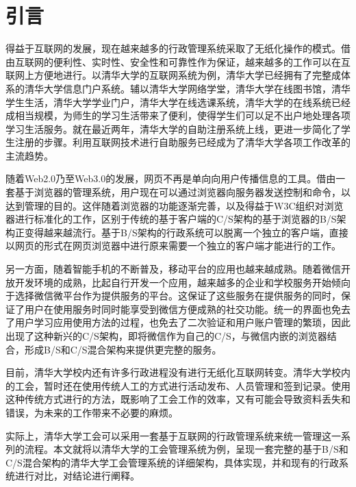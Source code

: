 \chapter{引言}

得益于互联网的发展，现在越来越多的行政管理系统采取了无纸化操作的模式。借由互联网的便利性、实时性、安全性和可靠性作为保证，越来越多的工作可以在互联网上方便地进行。以清华大学的互联网系统为例，清华大学已经拥有了完整成体系的清华大学信息门户系统。辅以清华大学网络学堂，清华大学在线图书馆，清华学生生活，清华大学学业门户，清华大学在线选课系统，清华大学的在线系统已经成相当规模，为师生的学习生活带来了便利，使得学生们可以足不出户地处理各项学习生活服务。就在最近两年，清华大学的自助注册系统上线，更进一步简化了学生注册的步骤。利用互联网技术进行自助服务已经成为了清华大学各项工作改革的主流趋势。

随着Web2.0乃至Web3.0的发展，网页不再是单向向用户传播信息的工具。借由一套基于浏览器的管理系统，用户现在可以通过浏览器向服务器发送控制和命令，以达到管理的目的。这伴随着浏览器的功能逐渐完善，以及得益于W3C组织对浏览器进行标准化的工作，区别于传统的基于客户端的C/S架构的基于浏览器的B/S架构正变得越来越流行。基于B/S架构的行政系统可以脱离一个独立的客户端，直接以网页的形式在网页浏览器中进行原来需要一个独立的客户端才能进行的工作。

另一方面，随着智能手机的不断普及，移动平台的应用也越来越成熟。随着微信开放开发环境的成熟，比起自行开发一个应用，越来越多的企业和学校服务开始倾向于选择微信微平台作为提供服务的平台。这保证了这些服务在提供服务的同时，保证了用户在使用服务时同时能享受到微信方便成熟的社交功能。统一的界面也免去了用户学习应用使用方法的过程，也免去了二次验证和用户账户管理的繁琐，因此出现了这种新兴的C/S架构，即将微信作为自己的C/S，与微信内嵌的浏览器结合，形成B/S和C/S混合架构来提供更完整的服务。

目前，清华大学校内还有许多行政进程没有进行无纸化互联网转变。清华大学校内的工会，暂时还在使用传统人工的方式进行活动发布、人员管理和签到记录。使用这种传统方式进行的方法，既影响了工会工作的效率，又有可能会导致资料丢失和错误，为未来的工作带来不必要的麻烦。

实际上，清华大学工会可以采用一套基于互联网的行政管理系统来统一管理这一系列的流程。本文就将以清华大学的工会管理系统为例，呈现一套完整的基于B/S和C/S混合架构的清华大学工会管理系统的详细架构，具体实现，并和现有的行政系统进行对比，对结论进行阐释。
